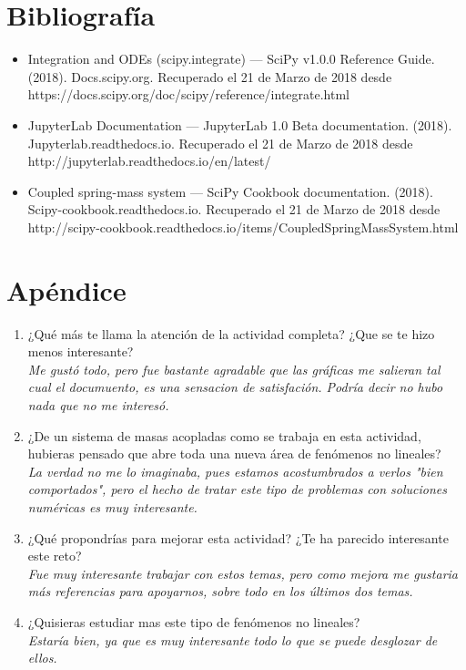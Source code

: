 \documentclass[12pt]{article}
\begin{document}
\section*{Bibliografía}
\begin{itemize}
\item Integration and ODEs (scipy.integrate) — SciPy v1.0.0 Reference Guide. (2018). Docs.scipy.org. Recuperado el 21 de Marzo de 2018 desde\\
https://docs.scipy.org/doc/scipy/reference/integrate.html
\item  JupyterLab Documentation — JupyterLab 1.0 Beta documentation. (2018). Jupyterlab.readthedocs.io.  Recuperado el 21 de Marzo de 2018 desde \\
http://jupyterlab.readthedocs.io/en/latest/
\item Coupled spring-mass system — SciPy Cookbook documentation. (2018). Scipy-cookbook.readthedocs.io. Recuperado el 21 de Marzo de 2018 desde\\
http://scipy-cookbook.readthedocs.io/items/CoupledSpringMassSystem.html
\end{itemize}

\section*{Apéndice}
\begin{enumerate}
\item ¿Qué más te llama la atención de la actividad completa? ¿Que se te hizo menos interesante?\\
\textit{Me gustó todo, pero fue bastante agradable que las gráficas me salieran tal cual el documuento, es una sensacion de satisfación. Podría decir no hubo nada que no me interesó.}

\item ¿De un sistema de masas acopladas como se trabaja en esta actividad, hubieras pensado que abre toda una nueva área de fenómenos no lineales?\\
\textit{La verdad no me lo imaginaba, pues estamos acostumbrados a verlos "bien comportados", pero el hecho de tratar este tipo de problemas con soluciones numéricas es muy interesante.}

\item ¿Qué propondrías para mejorar esta actividad? ¿Te ha parecido interesante este reto? \\
\textit{Fue muy interesante trabajar con estos temas, pero como mejora me gustaria más referencias para apoyarnos, sobre todo en los últimos dos temas.}

\item ¿Quisieras estudiar mas este tipo de fenómenos no lineales?\\
\textit{Estaría bien, ya que es muy interesante todo lo que se puede desglozar de ellos.}

\end{enumerate}
\end{document}
